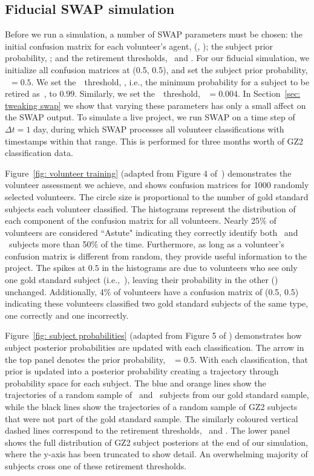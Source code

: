 \subsection{Fiducial SWAP simulation}\label{sec: fiducial}

Before we run a simulation, a number of SWAP parameters must be chosen: the initial confusion matrix for each volunteer's agent, (\Pf, \Pn); the subject prior probability, \p; and the retirement thresholds, \tf~and \tn. For our fiducial  simulation, we initialize all confusion matrices at (0.5, 0.5), and set the subject prior probability, \p~$= 0.5$. We set the~\feat~threshold, \tf, i.e., the minimum probability for a subject to be retired as~\feat, to $0.99$. Similarly, we set the~\notfeat~threshold, \tn~$= 0.004$. 
In Section~\ref{sec: tweaking swap} we show that varying these parameters has only a small affect on the SWAP output. 
To simulate a live project, we run SWAP on a time step of $\Delta t = 1$ day, during which SWAP processes all volunteer classifications with timestamps within that range. This is performed for three months worth of GZ2 classification data. 

Figure~\ref{fig: volunteer training} (adapted from Figure 4 of~\citealt{Marshall2016}) demonstrates the volunteer assessment we achieve, and shows confusion matrices for 1000 randomly selected volunteers. The circle size is proportional to the number of gold standard subjects each volunteer classified. The histograms represent the distribution of each component of the confusion matrix for all volunteers. Nearly 25\% of volunteers are considered ``Astute"  indicating they correctly identify both \feat~and \notfeat~subjects more than 50\% of the time. Furthermore, as long as a volunteer's confusion matrix is different from random, they provide useful information to the project. The spikes at $0.5$ in the histograms are due to volunteers who see only one gold standard subject (i.e.,~\feat), leaving their probability in the other (\notfeat) unchanged. Additionally, 4\% of volunteers have a confusion matrix of (0.5, 0.5) indicating these volunteers classified two gold standard subjects of the same type, one correctly and one incorrectly. 

Figure~\ref{fig: subject probabilities} (adapted from Figure 5 of \citealt{Marshall2016}) demonstrates how subject posterior probabilities are updated with each classification. The arrow in the top panel denotes the prior probability, \p~$=0.5$. With each classification, that prior is updated into a posterior probability creating a trajectory through probability space for each subject. The blue and orange lines show the trajectories of a random sample of \feat~and \notfeat~subjects from our gold standard sample, while the black lines show the trajectories of a random sample of GZ2 subjects that were not part of the gold standard  sample. The similarly coloured vertical dashed lines correspond to the retirement thresholds, \tf~and \tn. The lower panel shows the full distribution of GZ2 subject posteriors at the end of our simulation, where the y-axis has been truncated to show detail. An overwhelming majority of subjects cross one of these retirement thresholds.

